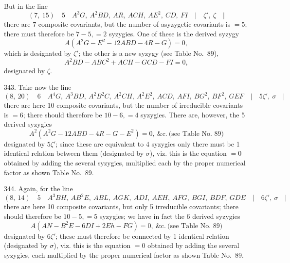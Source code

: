 \documentclass[11pt,a4paper]{article}
\begin{document}
But in the line
\[
(7,\ 15)\quad 5\quad A^{3}G,\ A^{2}BD,\ AR,\ ACH,\ AE^{2},\ CD,\ FI \quad|\quad \zeta',\ \zeta \quad|
\]
there are 7 composite covariants, but the number of asyzygetic covariants is $=5$; there must therefore be $7 - 5, = 2$ syzygies. One of these is the derived syzygy
\[
A(A^{2}G - E^{2} - 12ABD - 4R - G) = 0,
\]
which is designated by $\zeta'$; the other is a new syzygy (see Table No.~89),
\[
A^{2}BD - ABC^{2} + ACH - GCD - FI = 0,
\]
designated by $\zeta$.

343. Take now the line
\[
(8,\ 20)\quad 6\quad A^{4}G,\ A^{3}BD,\ A^{2}B^{2}C,\ A^{2}CH,\ A^{2}E^{2},\ ACD,\ AFI,\ BG^{2},\ BF^{2},\ GEF \quad|\quad 5\zeta',\ \sigma \quad|\quad
\]
there are here 10 composite covariants, but the number of irreducible covariants is $=6$; there should therefore be $10 - 6, = 4$ syzygies. There are, however, the 5 derived syzygies
\[
A^{2}(A^{2}G - 12ABD - 4R - G - E^{2}) = 0,\ \&\text{c.}\ \text{(see Table No.~89)}
\]
designated by $5\zeta'$; since these are equivalent to 4 syzygies only there must be 1 identical relation between them (designated by $\sigma$), viz. this is the equation $= 0$ obtained by adding the several syzygies, multiplied each by the proper numerical factor as shown Table No.~89.

344. Again, for the line
\[
(8,\ 14)\quad 5\quad A^{3}BH,\ AB^{2}E,\ ABL,\ AGK,\ ADI,\ AEH,\ AFG,\ BGI,\ BDF,\ GDE \quad|\quad 6\zeta',\ \sigma \quad|
\]
there are here 10 composite covariants, but only 5 irreducible covariants; there should therefore be $10 - 5, = 5$ syzygies; we have in fact the 6 derived syzygies
\[
A(AN - B^{2}E - 6DI + 2Eh - FG) = 0,\ \&\text{c.}\ \text{(see Table No.~89)}
\]
designated by $6\zeta'$; these must therefore be connected by 1 identical relation (designated by $\sigma$), viz. this is the equation $= 0$ obtained by adding the several syzygies, each multiplied by the proper numerical factor as shown Table No.~89.
\end{document}
